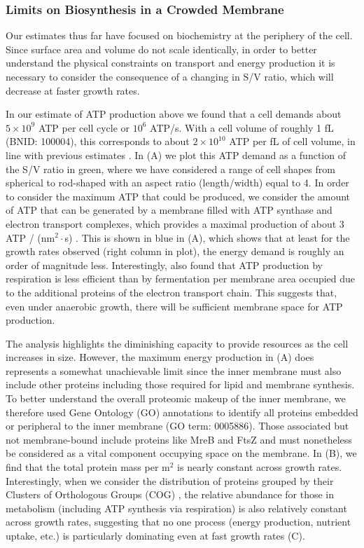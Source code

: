 \subsubsection{Limits on Biosynthesis in a Crowded Membrane}
Our estimates thus far have focused on biochemistry at the periphery of the cell.
Since surface area and volume do not scale identically, in order to better
understand the physical constraints on transport and energy production it is
necessary to consider the consequence of a changing in S/V ratio, which will
decrease at faster growth rates.

In our estimate of ATP production above we found that a cell demands about $5
\times 10^9$ ATP per cell cycle or $10^6$ ATP/s. With a cell volume of roughly 1
fL (BNID: 100004), this corresponds to about $2 \times 10^{10}$ ATP per fL of cell volume, in
line with previous estimates \citep{stouthamer1977, szenk2017}. In
 (A) we plot this ATP demand as a function of the S/V ratio
in green, where we have considered a range of cell shapes from spherical to
rod-shaped with an aspect ratio (length/width) equal to 4. In order to consider
the maximum ATP that could be produced, we consider the amount of ATP that can
be generated by a membrane filled with ATP synthase and electron transport
complexes, which provides a maximal production of about 3 ATP / (nm$^2 \cdot$s)
\citep{szenk2017}. This is shown in blue in (A), which shows
that at least for the growth rates observed (right column in plot), the energy
demand is roughly an order of magnitude less. Interestingly, \cite{szenk2017}
also found that ATP production by respiration is less efficient than by
fermentation per membrane area occupied due to the additional proteins of the
electron transport chain. This suggests that, even under anaerobic growth, there
will be sufficient membrane space for ATP production.

The analysis highlights the diminishing capacity to provide resources as the
cell increases in size. However, the maximum energy production in
(A) does represents a somewhat unachievable limit since
the inner membrane must also include other proteins including those required
for lipid and membrane synthesis. To better
understand the overall proteomic makeup of the inner membrane, we therefore
used Gene Ontology (GO) annotations \citep{ashburner2000,
thegeneOntologyconsortium2018} to identify all proteins embedded or
peripheral to the inner membrane (GO term: 0005886). Those associated but not
membrane-bound include proteins like MreB and FtsZ and must nonetheless be considered as a vital
component occupying space on the membrane. In (B), we
find that the total protein mass per \textmu m$^2$ is nearly constant across
growth rates. Interestingly, when we consider the distribution of proteins
grouped by their Clusters of Orthologous Groups (COG) \citep{tatusov2000},
the relative abundance for those in metabolism (including ATP synthesis via
respiration) is also relatively constant across growth rates, suggesting that
no one process (energy production, nutrient uptake, etc.) is particularly
dominating even at fast growth rates (C).

